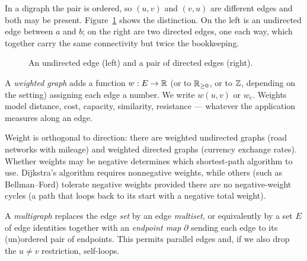 In a digraph the pair is ordered, so $(u,v)$ and $(v,u)$ are different edges and
both may be present. Figure~\ref{fig:ch01-directed-undirected} shows the distinction. On the left is an
undirected edge between $a$ and $b$; on the right are two directed edges, one each
way, which together carry the same connectivity but twice the bookkeeping.

\begin{figure}[htbp]
\centering
{}
\caption{An undirected edge (left) and a pair of directed edges (right).}
\label{fig:ch01-directed-undirected}
\end{figure}

\begin{definition}
\label{ch01:def-weighted}
A \emph{weighted graph} adds a function $w : E \to \mathbb{R}$ (or to $\mathbb{R}_{\ge 0}$, or to
$\mathbb{Z}$, depending on the setting) assigning each edge a number. We write $w(u,v)$
or $w_e$. Weights model distance, cost, capacity, similarity, resistance ---
whatever the application measures along an edge.
\end{definition}

Weight is orthogonal to direction: there are weighted undirected graphs (road
networks with mileage) and weighted directed graphs (currency exchange rates).
Whether weights may be negative determines which shortest-path algorithm to use. Dijkstra's algorithm requires nonnegative weights, while others (such as Bellman--Ford) tolerate negative weights provided there are no negative-weight cycles (a path that loops back to its start with a negative total weight).

\begin{definition}[Multigraph]
\label{ch01:def-multigraph}
A \emph{multigraph} replaces the edge \emph{set} by an edge \emph{multiset}, or
equivalently by a set $E$ of edge identities together with an
\emph{endpoint map} $\partial$ sending each edge to its (un)ordered pair of
endpoints. This permits parallel edges and, if we also drop the $u \neq v$
restriction, self-loops.
\end{definition}

